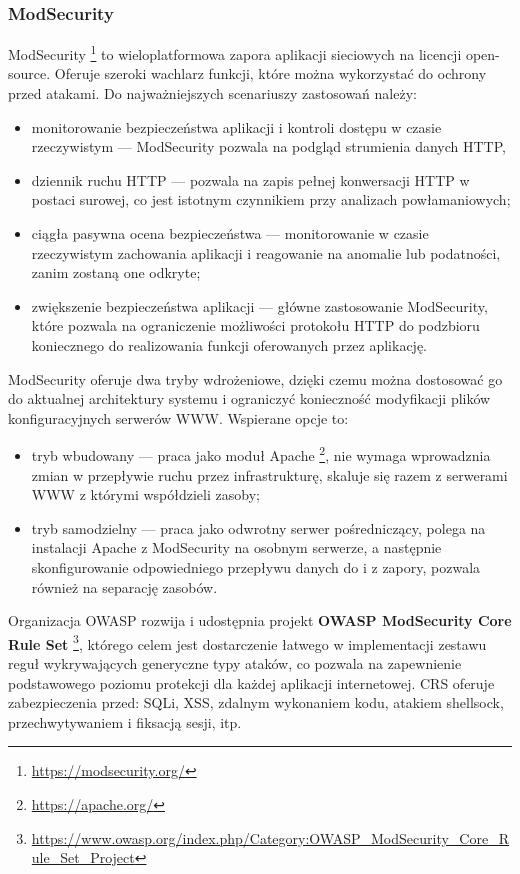 \documentclass[11pt,a4paper,polish,thesis]{dcsbook}
\begin{document}
\subsubsection{ModSecurity}
ModSecurity \footnote{\url{https://modsecurity.org/}} to wieloplatformowa zapora aplikacji sieciowych na licencji open-source. Oferuje szeroki wachlarz funkcji, które można wykorzystać do ochrony przed atakami. Do najważniejszych scenariuszy zastosowań należy:
\begin{itemize} 
\item monitorowanie bezpieczeństwa aplikacji i kontroli dostępu w czasie rzeczywistym --- ModSecurity pozwala na podgląd strumienia danych HTTP,
\item dziennik ruchu HTTP --- pozwala na zapis pełnej konwersacji HTTP w postaci surowej, co jest istotnym czynnikiem przy analizach powłamaniowych;
\item ciągła pasywna ocena bezpieczeństwa --- monitorowanie w czasie rzeczywistym zachowania aplikacji i reagowanie na anomalie lub podatności, zanim zostaną one odkryte;
\item zwiększenie bezpieczeństwa aplikacji --- główne zastosowanie ModSecurity, które pozwala na ograniczenie możliwości protokołu HTTP do podzbioru koniecznego do realizowania funkcji oferowanych przez aplikację.
\end{itemize}

ModSecurity oferuje dwa tryby wdrożeniowe, dzięki czemu można dostosować go do aktualnej architektury systemu i ograniczyć konieczność modyfikacji plików konfiguracyjnych serwerów WWW. Wspierane opcje to:
\begin{itemize}
\item tryb wbudowany --- praca jako moduł Apache \footnote{\url{https://apache.org/}}, nie wymaga wprowadznia zmian w przepływie ruchu przez infrastrukturę, skaluje się razem z serwerami WWW z którymi współdzieli zasoby;
\item tryb samodzielny --- praca jako odwrotny serwer pośredniczący, polega na instalacji Apache z ModSecurity na osobnym serwerze, a następnie skonfigurowanie odpowiedniego przepływu danych do i z zapory, pozwala również na separację zasobów.
\end{itemize}

Organizacja OWASP rozwija i udostępnia projekt \textbf{OWASP ModSecurity Core Rule Set} \footnote{\url{https://www.owasp.org/index.php/Category:OWASP_ModSecurity_Core_Rule_Set_Project}}, którego celem jest dostarczenie łatwego w implementacji zestawu reguł wykrywających generyczne typy ataków, co pozwala na zapewnienie podstawowego poziomu protekcji dla każdej aplikacji internetowej. CRS oferuje zabezpieczenia przed: SQLi, XSS, zdalnym wykonaniem kodu, atakiem shellsock, przechwytywaniem i fiksacją sesji, itp.
\end{document}
